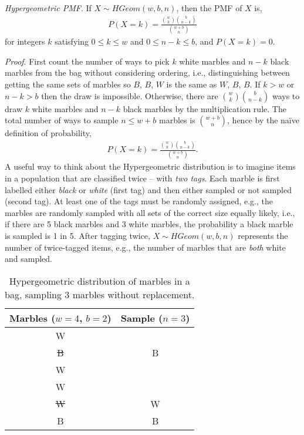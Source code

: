 \documentclass[11pt,a4paper]{article}
\begin{document}
\emph{Hypergeometric PMF}. 
If \(X \sim HGeom(w,b,n)\), 
then the PMF of \(X\) is,
\begin{align}
P(X = k) = \frac{\binom{w}{k}\binom{b}{n - k}}{\binom{w + b}{n}}
\end{align}
for integers \(k\) satisfying \(0 \leq k \leq w\) and
\(0 \leq n - k \leq b\), and \(P(X = k) = 0\).

\emph{Proof}. 
First count the number of ways to pick \(k\) white marbles
and \(n - k\) black marbles from the bag without considering ordering,
i.e., distinguishing between getting the same sets of marbles so \(B\),
\(B\), \(W\) is the same as \(W\), \(B\), \(B\). 
If \(k > w\) or \(n - k > b\) then the draw is impossible. 
Otherwise, there are
\(\binom{w}{k}\binom{b}{n - k}\) ways to draw \(k\) white marbles and
\(n - k\) black marbles by the multiplication rule. 
The total number of
ways to sample \(n \leq w + b\) marbles is \(\binom{w + b}{n}\), hence
by the naïve definition of probability,
\begin{align}
P(X = k) = \frac{\binom{w}{k}\binom{b}{n - k}}{\binom{w + b}{n}}.
\end{align}
A useful way to think about the Hypergeometric distribution is to
imagine items in a population that are classified twice 
-- with \emph{two tags}. 
Each marble is first labelled either \emph{black} or \emph{white} (first tag) 
and then either sampled or not sampled (second tag). 
At least one of the tags must be randomly assigned, e.g., 
the marbles are randomly sampled with all sets of the correct size equally likely, i.e., 
if there are 5 black marbles and 3 white marbles, 
the probability a black marble is sampled is 1 in 5. 
After tagging twice,
\(X \sim HGeom(w,b,n)\) represents the number of twice-tagged items,
e.g., the number of marbles that are \emph{both} white and sampled.

\begin{table}[h!]
\centering
\begin{tabular}{| c | c |}
\hline
Marbles (\(w=4\), \(b=2\)) & Sample (\(n=3\)) \\\hline
W &  \\\hline
\st{B} & B \\\hline
W &  \\\hline
W &  \\\hline
\st{W} & W \\\hline
B & B \\\hline
\end{tabular}
\caption{%
Hypergeometric distribution of marbles in a bag, 
sampling 3 marbles without replacement.
}
\end{table}
\end{document}
